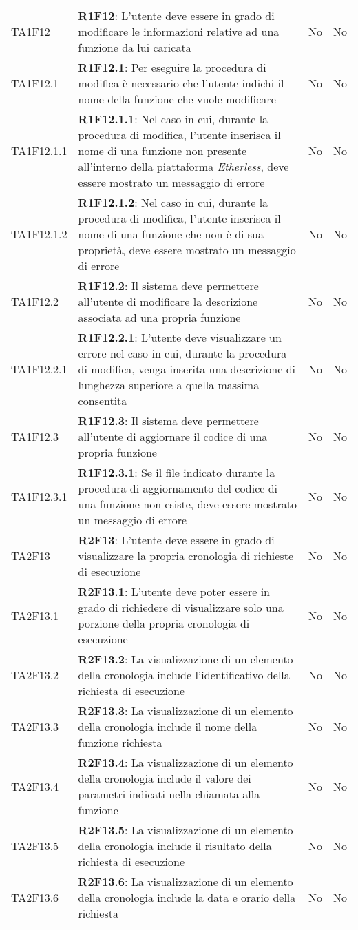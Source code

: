 \begin{longtable}{ 
		>{\centering}p{} 
		>{}p{} 
		>{\centering}p{}
		>{\centering}p{} }
	TA1F12 & \textbf{R1F12}: L'utente deve essere in grado di modificare le informazioni relative 
		ad una funzione da lui caricata 											& No & No \tabularnewline
	TA1F12.1 & \textbf{R1F12.1}: Per eseguire la procedura di modifica è necessario che l'utente 
		indichi il nome della funzione che vuole modificare 						& No & No \tabularnewline
	TA1F12.1.1 & \textbf{R1F12.1.1}: Nel caso in cui, durante la procedura di modifica, l'utente 
		inserisca il nome di una funzione non presente all'interno della piattaforma
		\textit{Etherless}, deve essere mostrato un messaggio di errore				& No & No \tabularnewline
	TA1F12.1.2 & \textbf{R1F12.1.2}: Nel caso in cui, durante la procedura di modifica, l'utente 
		inserisca il nome di una funzione che non è di sua proprietà, deve essere 
		mostrato un messaggio di errore												& No & No \tabularnewline
	TA1F12.2 & \textbf{R1F12.2}: Il sistema deve permettere all'utente di modificare la descrizione 
		associata ad una propria funzione 											& No & No \tabularnewline
	TA1F12.2.1 & \textbf{R1F12.2.1}: L'utente deve visualizzare un errore nel caso in cui, durante 
		la procedura di modifica, venga inserita una descrizione di lunghezza
		superiore a quella massima consentita 										& No & No \tabularnewline
	TA1F12.3 & \textbf{R1F12.3}: Il sistema deve permettere all'utente di aggiornare il codice di 
		una propria funzione 														& No & No \tabularnewline	
	TA1F12.3.1 & \textbf{R1F12.3.1}: Se il file indicato durante la procedura di aggiornamento del 
		codice di una funzione non esiste, deve essere mostrato un messaggio di 
		errore																		& No & No \tabularnewline
		
	TA2F13 & \textbf{R2F13}: L'utente deve essere in grado di visualizzare la propria cronologia 
		di richieste di esecuzione 													& No & No \tabularnewline
	TA2F13.1 & \textbf{R2F13.1}: L'utente deve poter essere in grado di richiedere di visualizzare
		solo una porzione della propria cronologia di esecuzione 					& No & No \tabularnewline
	TA2F13.2 & \textbf{R2F13.2}: La visualizzazione di un elemento della cronologia include 
		l'identificativo della richiesta di esecuzione 								& No & No \tabularnewline
	TA2F13.3 & \textbf{R2F13.3}: La visualizzazione di un elemento della cronologia include 
		il nome della funzione richiesta 											& No & No \tabularnewline				
	TA2F13.4 & \textbf{R2F13.4}: La visualizzazione di un elemento della cronologia include 
		il valore dei parametri indicati nella chiamata alla funzione				& No & No \tabularnewline
	TA2F13.5 & \textbf{R2F13.5}: La visualizzazione di un elemento della cronologia include 
		il risultato della richiesta di esecuzione									& No & No \tabularnewline
	TA2F13.6 & \textbf{R2F13.6}: La visualizzazione di un elemento della cronologia include 
		la data e orario della richiesta 											& No & No \tabularnewline
	

\end{longtable}
